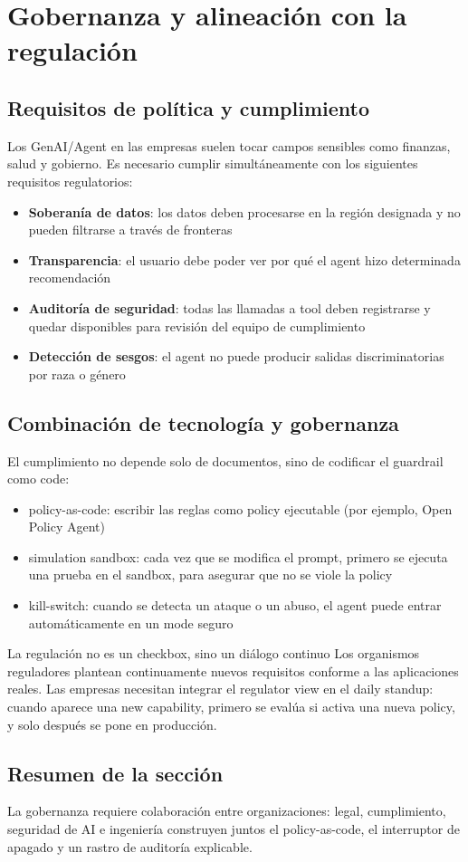 \section{Gobernanza y alineación con la regulación}

\subsection{Requisitos de política y cumplimiento}

Los GenAI/Agent en las empresas suelen tocar campos sensibles como finanzas, salud y gobierno. Es necesario cumplir simultáneamente con los siguientes requisitos regulatorios:

\begin{itemize}
    \item \textbf{Soberanía de datos}: los datos deben procesarse en la región designada y no pueden filtrarse a través de fronteras
    \item \textbf{Transparencia}: el usuario debe poder ver por qué el agent hizo determinada recomendación
    \item \textbf{Auditoría de seguridad}: todas las llamadas a tool deben registrarse y quedar disponibles para revisión del equipo de cumplimiento
    \item \textbf{Detección de sesgos}: el agent no puede producir salidas discriminatorias por raza o género
\end{itemize}

\subsection{Combinación de tecnología y gobernanza}

El cumplimiento no depende solo de documentos, sino de codificar el guardrail como code:

\begin{itemize}
    \item policy-as-code: escribir las reglas como policy ejecutable (por ejemplo, Open Policy Agent)
    \item simulation sandbox: cada vez que se modifica el prompt, primero se ejecuta una prueba en el sandbox, para asegurar que no se viole la policy
    \item kill-switch: cuando se detecta un ataque o un abuso, el agent puede entrar automáticamente en un mode seguro
\end{itemize}

\begin{warningbox}{La regulación no es un checkbox, sino un diálogo continuo}
Los organismos reguladores plantean continuamente nuevos requisitos conforme a las aplicaciones reales. Las empresas necesitan integrar el regulator view en el daily standup: cuando aparece una new capability, primero se evalúa si activa una nueva policy, y solo después se pone en producción.
\end{warningbox}

\subsection{Resumen de la sección}

La gobernanza requiere colaboración entre organizaciones: legal, cumplimiento, seguridad de AI e ingeniería construyen juntos el policy-as-code, el interruptor de apagado y un rastro de auditoría explicable.

